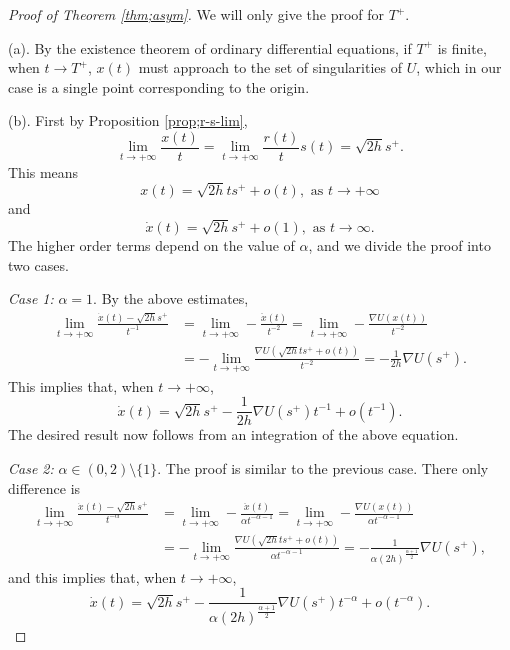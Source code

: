 \documentclass[11pt]{amsart}
\newcommand{\al}{\alpha}
\theoremstyle{plain}
\theoremstyle{definition}
\theoremstyle{remark}
\begin{document}
\begin{proof}[Proof of Theorem \ref{thm;asym}]
We will only give the proof for $T^+$.

(a). By the existence theorem of ordinary differential equations, if $T^{+}$ is finite, when $t \to T^{+}$, $x(t)$ must approach to the set of singularities of $U$, which in our case is a single point corresponding to the origin. 

(b). First by Proposition \ref{prop;r-s-lim},  
$$ \lim_{t \to +\infty} \frac{x(t)}{t} = \lim_{t \to +\infty} \frac{r(t)}{t} s(t) = \sqrt{2h} s^{+}. 
$$
This means
$$ x(t) = \sqrt{2h}t s^+ +o(t), \text{ as } t \to +\infty$$
and 
$$ \dot{x}(t) = \sqrt{2h}s^+ +o(1), \text{ as } t \to \infty. $$
The higher order terms depend on the value of $\al$, and we divide the proof into two cases. 


\emph{Case 1:} $\al=1$.  By the above estimates, 
$$ \begin{aligned}
\lim_{t \to +\infty} \frac{\dot{x}(t)-\sqrt{2h}s^+}{t^{-1}} & = \lim_{t \to +\infty} -\frac{\ddot{x}(t)}{t^{-2}} =  \lim_{t \to +\infty} -\frac{\nabla U(x(t))}{t^{-2}}\\
& =  -\lim_{t \to +\infty} \frac{\nabla U(\sqrt{2h}t s^+ + o(t))}{t^{-2}} = -\frac{1}{2h} \nabla U(s^+). 	
\end{aligned}
$$
This implies that, when $t \to +\infty$,
$$ \dot{x}(t) = \sqrt{2h} s^+ - \frac{1}{2h} \nabla U(s^+) t^{-1} + o(t^{-1}).
$$
The desired result now follows from an integration of the above equation.  

\emph{Case 2:}  $\al \in (0, 2) \setminus \{1\}$. The proof is similar to the previous case. There only difference is 
$$ \begin{aligned}
\lim_{t \to +\infty} \frac{\dot{x}(t)-\sqrt{2h}s^+}{t^{-\al}} &= \lim_{t \to +\infty} -\frac{\ddot{x}(t)}{\al t^{-\al-1}} = \lim_{t \to +\infty} -\frac{\nabla U(x(t))}{\al t^{-\al-1}}\\
& =  -\lim_{t \to +\infty} \frac{\nabla U(\sqrt{2h}t s^+ + o(t))}{\al t^{-\al-1}} = -\frac{1}{\al (2h)^{\frac{\al+1}{2}}} \nabla U(s^+),
\end{aligned}
$$
and this implies that, when $t \to +\infty$, 
$$  \dot{x}(t) = \sqrt{2h} s^+ -  \frac{1}{\al (2h)^{\frac{\al+1}{2}}} \nabla U(s^+) t^{-\al} + o(t^{-\al}).
$$
\end{proof}







\end{document}
